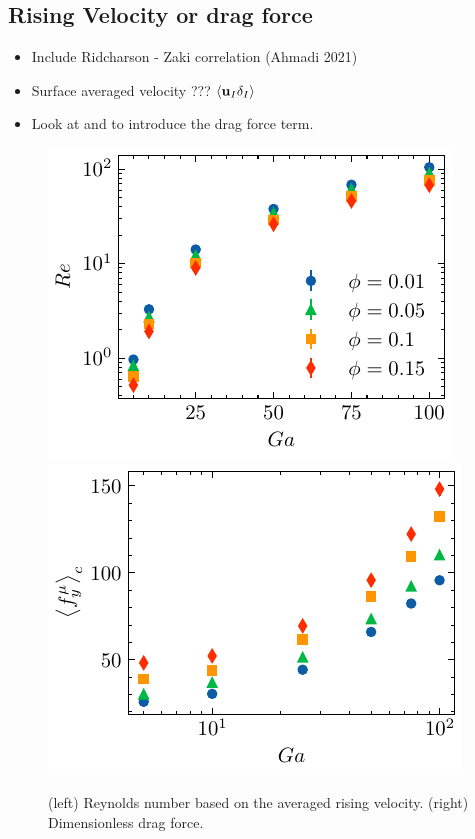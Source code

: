 \subsection{Rising Velocity or drag force}

\begin{itemize}
    \item Include Ridcharson - Zaki correlation (Ahmadi 2021)
    \item Surface averaged velocity  ???  $\left<\textbf{u}_I\delta_I\right>$
    \item Look at \citet{jackson2000dynamics} and \citet{wang2021numerical} to introduce the drag force term. 
\end{itemize}

\begin{figure}[h!]
    \centering
    \includegraphics[height = 0.3\textwidth]{image/HOMOGENEOUS/fCA/Re.pdf}
    \includegraphics[height = 0.3\textwidth]{image/HOMOGENEOUS/fCA/FH_mu_Ga.pdf}
    \caption{(left) Reynolds number based on the averaged rising velocity.
    (right) Dimensionless drag force.}
\end{figure}